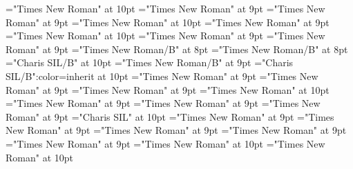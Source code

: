 \documentclass[gps1,twoside]{article}
\begin{document}
\font\spanensensenumberpicturepicturesentryspandiventryletData="Times New Roman" at 10pt
\font\captionpicturepicturesentryspandiventryletData="Times New Roman" at 9pt
\font\spancaptionpicturepicturesentryspandiventryletData="Times New Roman" at 9pt
\font\spanenspancaptionpicturepicturesentryspandiventryletData="Times New Roman" at 10pt
\font\scientificnamesensespanspandiventryletData="Times New Roman" at 9pt
\font\spanenscientificnamesensespanspandiventryletData="Times New Roman" at 10pt
\font\subentriesdiventryletData="Times New Roman" at 9pt
\font\subentrysubentriesdiventryletData="Times New Roman" at 9pt
\font\headwordsubentrysubentriesdiventryletData="Times New Roman/B" at 8pt
\font\headwordaftersubentrysubentriesdiventryletData="Times New Roman/B" at 8pt
\font\spanbzhheadwordsubentrysubentriesdiventryletData="Charis SIL/B" at 10pt
\font\spanheadwordsubentrysubentriesentrylastchildafterheadwordsubentrysubentriesdiventryletData="Times New Roman/B" at 9pt
\font\aspanbzhheadwordsubentrysubentriesdiventryletData="Charis SIL/B":color=inherit at 10pt
\font\spansubentrysubentriesdiventryletData="Times New Roman" at 9pt
\font\complexformtypespansubentrysubentriesdiventryletData="Times New Roman" at 9pt
\font\spancomplexformtypespansubentrysubentriesdiventryletData="Times New Roman" at 9pt
\font\spanenspancomplexformtypespansubentrysubentriesdiventryletData="Times New Roman" at 10pt
\font\spanreverseabbrvariantentrytypevariantentrytypesvariantformentrybackrefvariantformentrybackrefssensesensessensesensessubentrysubentriesentrylastchildafterspancomplexformtypespansubentrysubentriesdiventryletData="Times New Roman" at 9pt
\font\pronunciationspansubentrysubentriesdiventryletData="Times New Roman" at 9pt
\font\spanpronunciationspansubentrysubentriesdiventryletData="Times New Roman" at 9pt
\font\spanbzhfonipaspanpronunciationspansubentrysubentriesdiventryletData="Charis SIL" at 10pt
\font\spanformpronunciationpronunciationssubentrysubentriesentryfirstchildbeforespanpronunciationspansubentrysubentriesdiventryletData="Times New Roman" at 9pt
\font\spanformpronunciationpronunciationssubentrysubentriesentrylastchildafterspanpronunciationspansubentrysubentriesdiventryletData="Times New Roman" at 9pt
\font\spanspansubentrysubentriesdiventryletData="Times New Roman" at 9pt
\font\sensespanspansubentrysubentriesdiventryletData="Times New Roman" at 9pt
\font\spansensespanspansubentrysubentriesdiventryletData="Times New Roman" at 9pt
\font\spanenspansensespanspansubentrysubentriesdiventryletData="Times New Roman" at 10pt
\font\spandefinitionorglossreferencedentryreferencedentriescomplexformentryrefcomplexformentryrefsminorentryvariantfirstchildbeforespansensespanspansubentrysubentriesdiventryletData="Times New Roman" at 10pt
\end{document}
